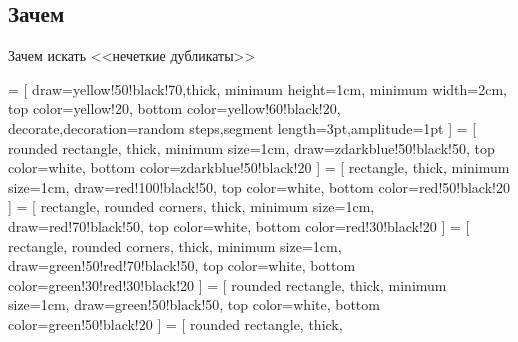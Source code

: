 

\subsection{Зачем}

\begin{frame}{Зачем искать <<нечеткие дубликаты>>}


    \begin{center}
        \begin{scriptsize}
             = [
                draw=yellow!50!black!70,thick,
                minimum height=1cm,
                minimum width=2cm,
                top color=yellow!20,
                bottom color=yellow!60!black!20,
                decorate,decoration={random steps,segment length=3pt,amplitude=1pt}
            ]
             = [
                rounded rectangle,
                thick,
                minimum size=1cm,
                draw=zdarkblue!50!black!50,
                top color=white,
                bottom color=zdarkblue!50!black!20
            ]
             = [
                rectangle,
                thick,
                minimum size=1cm,
                draw=red!100!black!50,
                top color=white,
                bottom color=red!50!black!20
            ]
             = [
                rectangle, rounded corners,
                thick,
                minimum size=1cm,
                draw=red!70!black!50,
                top color=white,
                bottom color=red!30!black!20
            ]
             = [
                rectangle, rounded corners,
                thick,
                minimum size=1cm,
                draw=green!50!red!70!black!50,
                top color=white,
                bottom color=green!30!red!30!black!20
            ]
             = [
                rounded rectangle,
                thick,
                minimum size=1cm,
                draw=green!50!black!50,
                top color=white,
                bottom color=green!50!black!20
            ]
             = [
                rounded rectangle,
                thick,

\end{scriptsize}
\end{center}
\end{frame}
